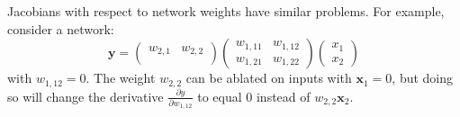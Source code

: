 \documentclass{article}
\begin{document}
Jacobians with respect to network weights have similar problems. For example, consider a network:
\begin{equation}
\mathbf{y}=
\begin{pmatrix}
w_{2,1} & w_{2,2}\\
\end{pmatrix} \begin{pmatrix}
w_{1,11} & w_{1,12}\\
w_{1,21} & w_{1,22}
\end{pmatrix} \begin{pmatrix}
x_1 \\
x_2 
\end{pmatrix} 
\end{equation}
with $w_{1,12}=0$. The weight $w_{2,2}$ can be ablated on inputs with $\mathbf{x}_1=0$, but doing so will change the derivative $\frac{\partial y}{\partial w_{1,12}}$ to equal $0$ instead of $w_{2,2} \mathbf{x}_2$.
\end{document}
